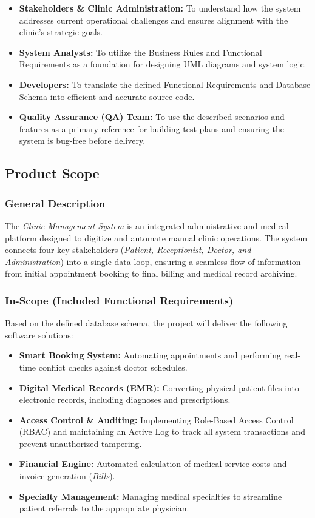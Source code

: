 \begin{itemize}
	\item \textbf{Stakeholders \& Clinic Administration:} To understand how the system addresses current operational challenges and ensures alignment with the clinic’s strategic goals.
	\item \textbf{System Analysts:} To utilize the Business Rules and Functional Requirements as a foundation for designing UML diagrams and system logic.
	\item \textbf{Developers:} To translate the defined Functional Requirements and Database Schema into efficient and accurate source code.
	\item \textbf{Quality Assurance (QA) Team:} To use the described scenarios and features as a primary reference for building test plans and ensuring the system is bug-free before delivery.
\end{itemize}

\subsection{Product Scope}

\subsubsection{General Description}

The \textit{Clinic Management System} is an integrated administrative and medical platform designed to digitize and automate manual clinic operations. The system connects four key stakeholders (\textit{Patient, Receptionist, Doctor, and Administration}) into a single data loop, ensuring a seamless flow of information from initial appointment booking to final billing and medical record archiving.

\subsubsection{In-Scope (Included Functional Requirements)}

Based on the defined database schema, the project will deliver the following software solutions:

\begin{itemize}
	\item \textbf{Smart Booking System:} Automating appointments and performing real-time conflict checks against doctor schedules.
	\item \textbf{Digital Medical Records (EMR):} Converting physical patient files into electronic records, including diagnoses and prescriptions.
	\item \textbf{Access Control \& Auditing:} Implementing Role-Based Access Control (RBAC) and maintaining an Active Log to track all system transactions and prevent unauthorized tampering.
	\item \textbf{Financial Engine:} Automated calculation of medical service costs and invoice generation (\textit{Bills}).
	\item \textbf{Specialty Management:} Managing medical specialties to streamline patient referrals to the appropriate physician.
\end{itemize}

